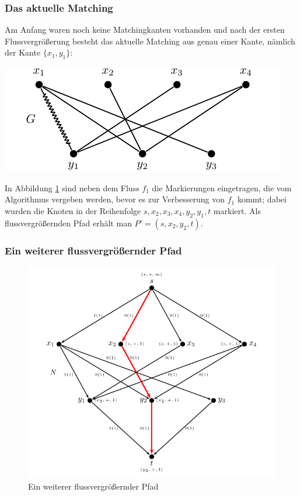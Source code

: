 \documentclass[smaller]{beamer}
\begin{document}
\begin{frame}
 \frametitle{Das aktuelle Matching}
  \alert{Am Anfang waren noch keine Matchingkanten vorhanden und nach der ersten Flussvergrößerung besteht das aktuelle Matching aus genau einer Kante, nämlich der Kante $\big\{ x_1,y_1 \big\}$}:
 \begin{center}
  \includegraphics{fig50.pdf}
 \end{center}
In Abbildung \ref{abb:11:3} sind neben dem Fluss $f_1$ die Markierungen eingetragen, die vom Algorithmus vergeben werden, bevor es zur Verbesserung von $f_1$ kommt; dabei wurden die Knoten in der Reihenfolge $s,x_2,x_3,x_4,y_2,y_1,t$ markiert. Als flussvergrößernden Pfad erhält man $P'=(s,x_2,y_2,t)$.
\end{frame}

\begin{frame}
 \frametitle{Ein weiterer flussvergrößernder Pfad}
 \begin{figure}
  \begin{center}
   \includegraphics[scale = 0.72]{fig51.pdf}
  \end{center}
  \caption{Ein weiterer flussvergrößernder Pfad}
  \label{abb:11:3}
 \end{figure}

\end{frame}
\end{document}
